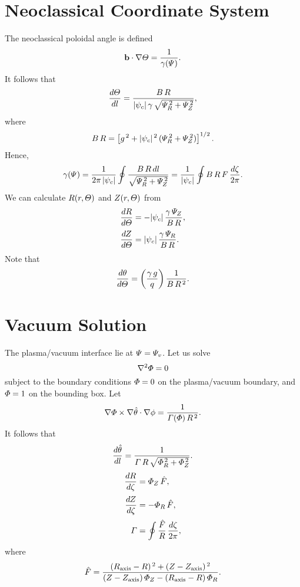 \documentclass[notitlepage,12pt]{article}
\begin{document}
\section{Neoclassical Coordinate System}
The neoclassical poloidal angle is defined
\begin{equation}
{\bf b}\cdot\nabla {\mit\Theta} = \frac{1}{\gamma({\mit\Psi})}.
\end{equation}
It follows that
\begin{equation}
\frac{d{\mit\Theta}}{dl} = \frac{B\,R}{|\psi_c|\,\gamma\,\sqrt{{\mit\Psi}_R^{\,2}+{\mit\Psi}_Z^{\,2}}},
\end{equation}
where
\begin{equation}
B\,R = \left[g^{\,2} + |\psi_c|^{\,2}\,({\mit\Psi}_R^{\,2}+{\mit\Psi}_Z^{\,2})\right]^{1/2}.
\end{equation}
Hence,
\begin{equation}
\gamma({\mit\Psi}) = \frac{1}{2\pi\,|\psi_c|}\oint\frac{B\,R\,dl}{\sqrt{{\mit\Psi}_R^{\,2}+{\mit\Psi}_Z^{\,2}}}= \frac{1}{|\psi_c|}\oint B\,R\,F\,\frac{d\zeta}{2\pi}.
\end{equation}
We can calculate $R(r,{\mit\Theta})$ and $Z(r,{\mit\Theta})$ from 
\begin{align}
\frac{dR}{d{\mit\Theta}} &=-|\psi_c|\,\frac{\gamma\,{\mit\Psi}_Z}{B\,R},\\[0.5ex]
\frac{dZ}{d{\mit\Theta}} &=|\psi_c|\,\frac{\gamma\,{\mit\Psi}_R}{B\,R}.
\end{align}
Note that
\begin{equation}
\frac{d\theta} {d{\mit\Theta}}= \left(\frac{\gamma\,g}{q}\right)\frac{1}{B\,R^{\,2}}.
\end{equation}

\section{Vacuum Solution}
The plasma/vacuum interface lie at ${\mit\Psi}= {\mit\Psi}_{v}$. Let us solve
\begin{equation}
\nabla^2{\mit\Phi} = 0
\end{equation}
subject to the boundary conditions ${\mit\Phi}=0$ on the plasma/vacuum boundary, and ${\mit\Phi}=1$ on the
bounding box. Let
\begin{equation}
\nabla{\mit\Phi}\times\nabla\hat{\theta}\cdot\nabla\phi = \frac{1}{{\mit\Gamma}({\mit\Phi})\,R^{\,2}}.
\end{equation} 
It follows that
\begin{equation}
\frac{d\hat{\theta}}{dl} = \frac{1}{{\mit\Gamma}\,R\,\sqrt{{\mit\Phi}_R^{\,2}+{\mit\Phi}_Z^{\,2}}}.
\end{equation}
\begin{align}
\frac{dR}{d\zeta} &= {\mit\Phi}_Z\,\hat{F},\\[0.5ex]
\frac{dZ}{d\zeta} &= -{\mit\Phi}_R\,\hat{F},\\[0.5ex]
{\mit\Gamma} &= \oint \frac{\hat{F}}{R}\,\frac{d\zeta}{2\pi},
\end{align}
where
\begin{equation}
\hat{F} = \frac{(R_{\rm axis}-R)^{\,2} + (Z-Z_{\rm axis})^{\,2}}{(Z-Z_{\rm axis})\,{\mit\Phi}_Z - (R_{\rm axis}-R)\,{\mit\Phi}_R}.
\end{equation}
\end{document}
